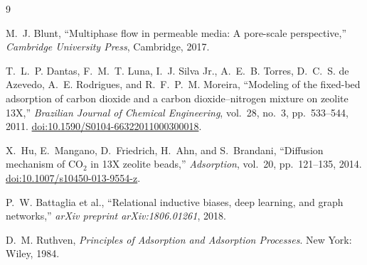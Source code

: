 \documentclass[12pt,a4paper]{article}
\begin{document}
\begin{thebibliography}{9}
\small

M.~J. Blunt,
``Multiphase flow in permeable media: A pore-scale perspective,''
\emph{Cambridge University Press}, Cambridge, 2017.

T.~L.~P. Dantas, F.~M.~T. Luna, I.~J. Silva Jr., A.~E.~B. Torres,
D.~C.~S. de Azevedo, A.~E. Rodrigues, and R.~F.~P.~M. Moreira,
``Modeling of the fixed-bed adsorption of carbon dioxide and a carbon
dioxide--nitrogen mixture on zeolite 13X,''
\emph{Brazilian Journal of Chemical Engineering}, vol.~28, no.~3,
pp.~533--544, 2011.
\href{https://doi.org/10.1590/S0104-66322011000300018}
{doi:10.1590/S0104-66322011000300018}.

X.~Hu, E.~Mangano, D.~Friedrich, H.~Ahn, and S.~Brandani,
``Diffusion mechanism of CO$_2$ in 13X zeolite beads,''
\emph{Adsorption}, vol.~20, pp.~121--135, 2014.
\href{https://doi.org/10.1007/s10450-013-9554-z}
{doi:10.1007/s10450-013-9554-z}.

P.~W. Battaglia et al.,
``Relational inductive biases, deep learning, and graph networks,''
\emph{arXiv preprint arXiv:1806.01261}, 2018.

D.~M. Ruthven,
\emph{Principles of Adsorption and Adsorption Processes}.
New York: Wiley, 1984.

\end{thebibliography}
\end{document}
